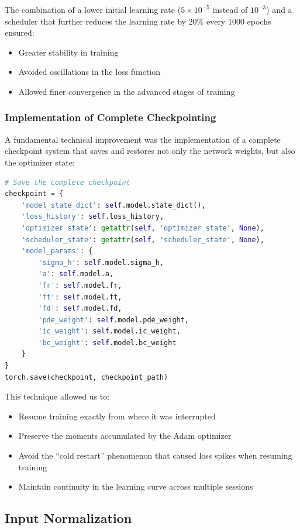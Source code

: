 The combination of a lower initial learning rate ($5 \times 10^{-5}$ instead of $10^{-3}$) and a scheduler that further reduces the learning rate by 20\% every 1000 epochs ensured:
\begin{itemize}
    \item Greater stability in training
    \item Avoided oscillations in the loss function
    \item Allowed finer convergence in the advanced stages of training
\end{itemize}

\subsubsection{Implementation of Complete Checkpointing}

A fundamental technical improvement was the implementation of a complete checkpoint system that saves and restores not only the network weights, but also the optimizer state:
\begin{lstlisting}[language=Python]
# Save the complete checkpoint
checkpoint = {
    'model_state_dict': self.model.state_dict(),
    'loss_history': self.loss_history,
    'optimizer_state': getattr(self, 'optimizer_state', None),
    'scheduler_state': getattr(self, 'scheduler_state', None),
    'model_params': {
        'sigma_h': self.model.sigma_h,
        'a': self.model.a,
        'fr': self.model.fr,
        'ft': self.model.ft,
        'fd': self.model.fd,
        'pde_weight': self.model.pde_weight,
        'ic_weight': self.model.ic_weight,
        'bc_weight': self.model.bc_weight
    }
}
torch.save(checkpoint, checkpoint_path)
\end{lstlisting}

This technique allowed us to:
\begin{itemize}
    \item Resume training exactly from where it was interrupted
    \item Preserve the moments accumulated by the Adam optimizer
    \item Avoid the ``cold restart'' phenomenon that caused loss spikes when resuming training
    \item Maintain continuity in the learning curve across multiple sessions
\end{itemize}

\subsection{Input Normalization}

